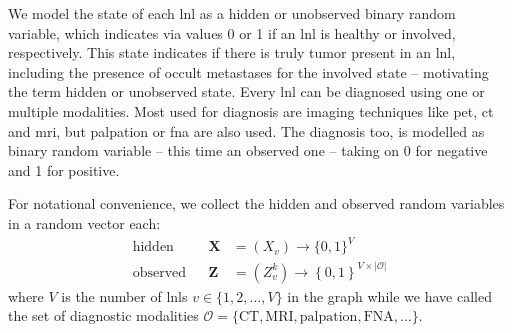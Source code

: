 \documentclass[../ms.tex]{subfiles}
\begin{document}
We model the state of each \gls{lnl} as a hidden or unobserved binary random variable, which indicates via values 0 or 1 if an \gls{lnl} is healthy or involved, respectively. This state indicates if there is truly tumor present in an \gls{lnl}, including the presence of occult metastases for the involved state – motivating the term hidden or unobserved state. Every \gls{lnl} can be diagnosed using one or multiple modalities. Most used for diagnosis are imaging techniques like \gls{pet}, \gls{ct} and \gls{mri}, but palpation or \gls{fna} are also used. The diagnosis too, is modelled as binary random variable – this time an observed one – taking on 0 for negative and 1 for positive.

For notational convenience, we collect the hidden and observed random variables in a random vector each:
%
\begin{equation}
    \begin{aligned}
        \text{hidden}& & \mathbf{X} &= ( X_v ) \rightarrow \{ 0,1 \}^V \\
        \text{observed}& & \mathbf{Z} &= ( Z_v^k ) \rightarrow \left\{ 0, 1 \right\}^{V \times |\mathcal{O}|}
    \end{aligned}
\end{equation}
%
where $V$ is the number of \glspl{lnl} $v \in \{ 1,2,\ldots,V \}$ in the graph while we have called the set of diagnostic modalities $\mathcal{O} = \{ \text{CT}, \text{MRI}, \text{palpation}, \text{FNA}, \ldots \}$.
\end{document}

